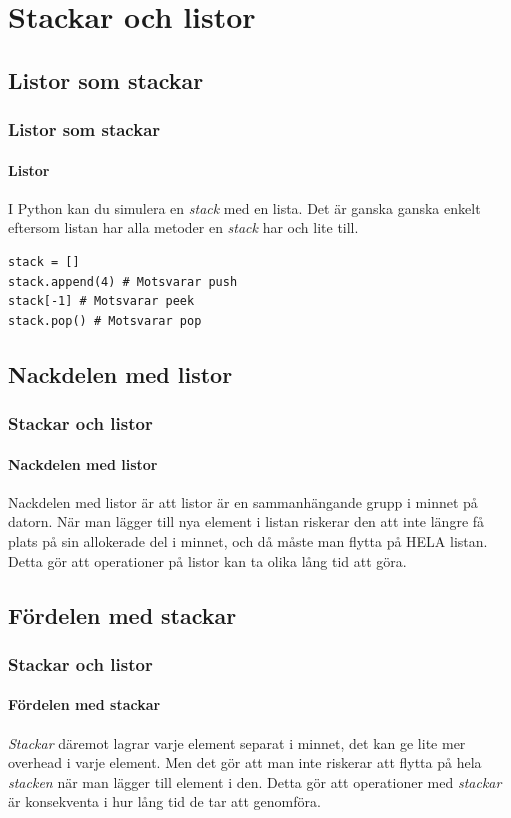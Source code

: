 \documentclass[aspectratio=169]{beamer}
\begin{document}
\section{Stackar och listor}

\subsection{Listor som stackar}

\begin{frame}[fragile]
	\frametitle{Listor som stackar}
	\framesubtitle{Listor}

	I Python kan du simulera en \textit{stack} med en lista. Det är ganska ganska enkelt eftersom listan har alla metoder en \textit{stack} har och lite till.
	
	\begin{lstlisting}
stack = []
stack.append(4) # Motsvarar push
stack[-1] # Motsvarar peek
stack.pop() # Motsvarar pop
	\end{lstlisting}
	
\end{frame}
	
\subsection{Nackdelen med listor}
	
\begin{frame}
	\frametitle{Stackar och listor}
	\framesubtitle{Nackdelen med listor}
	
	Nackdelen med listor är att listor är en sammanhängande grupp i minnet på datorn. När man lägger till nya element i listan riskerar den att inte längre få plats på sin allokerade del i minnet, och då måste man flytta på HELA listan. Detta gör att operationer på listor kan ta olika lång tid att göra.

\end{frame}

\subsection{Fördelen med stackar}

\begin{frame}
	\frametitle{Stackar och listor}
	\framesubtitle{Fördelen med stackar}
	
	\textit{Stackar} däremot lagrar varje element separat i minnet, det kan ge lite mer overhead i varje element. Men det gör att man inte riskerar att flytta på hela \textit{stacken} när man lägger till element i den. Detta gör att operationer med \textit{stackar} är konsekventa i hur lång tid de tar att genomföra.
	
\end{frame}
\end{document}
